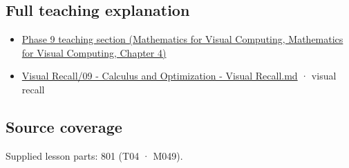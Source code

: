 \subsection{Full teaching explanation}\label{appendix-a59658325cd6-full-teaching-explanation}

\begin{itemize}
\tightlist
\item
  \href{../02-Mathematics-for-Visual-Computing/main.pdf\#nameddest=01-foundations-i-ch020-functions-limits-continuity-and-scalar-change}{Phase 9 teaching section (Mathematics for Visual Computing, Mathematics for Visual Computing, Chapter 4)}
\item
  \hyperref[appendix-adf48f5dc5c1]{Visual Recall/09 - Calculus and Optimization - Visual Recall.md} · visual recall
\end{itemize}

\subsection{Source coverage}\label{appendix-a59658325cd6-source-coverage}

Supplied lesson parts: 801 (T04 · M049).
